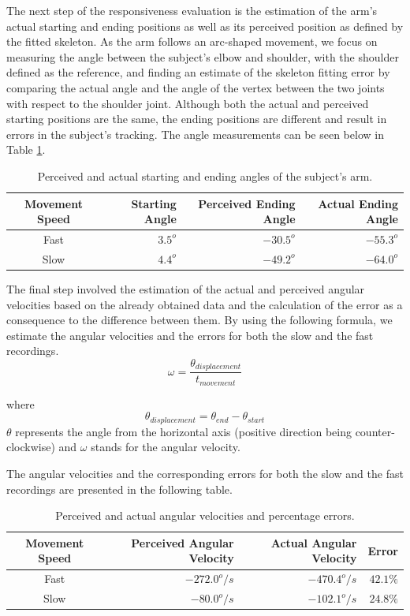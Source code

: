 \documentclass[11pt,a4paper]{article}
\begin{document}
\noindent
The next step of the responsiveness evaluation is the estimation of the arm's actual starting and ending positions as well as its perceived position as defined by the fitted skeleton. As the arm follows an arc-shaped movement, we focus on measuring the angle between the subject's elbow and shoulder, with the shoulder  defined as the reference, and finding an estimate of the skeleton fitting error by comparing the actual angle and the angle of the vertex between the two joints with respect to the shoulder joint. Although both the actual and perceived starting positions are the same, the ending positions are different and result in errors in the subject's tracking. The angle measurements can be seen below in Table \ref{angle_error}.

\begin{table}[H]
\center
\begin{tabular}{| c | r | r | r |}
\hline
Movement Speed & Starting Angle & Perceived Ending Angle & Actual Ending Angle\\
\hline
Fast & $3.5^o$ & $-30.5^o$ & $-55.3^o$\\
Slow & $4.4^o$ & $-49.2^o$ & $-64.0^o$\\
\hline
\end{tabular}
\caption{Perceived and actual starting and ending angles of the subject's arm.}
\label{angle_error}
\end{table}

\noindent
The final step involved the estimation of the actual and perceived angular velocities based on the already obtained data and the calculation of the error as a consequence to the difference between them. By using the following formula, we estimate the angular velocities and the errors for both the slow and the fast recordings.
\begin{equation}
\omega = \frac{\theta_{displacement}}{t_{movement}} 
\end{equation}

\noindent where \[\theta_{displacement} = \theta_{end} - \theta_{start}\]
$\theta$ represents the angle from the horizontal axis (positive direction being counter-clockwise) and $\omega$ stands for the angular velocity.
 
\noindent 
The angular velocities and the corresponding errors for both the slow and the fast recordings are presented in the following table.

\begin{table}[H]
\center
\begin{tabular}{| c | r | r | r |}
\hline
Movement Speed & Perceived Angular Velocity & Actual Angular Velocity & Error\\
\hline
Fast & $-272.0^o/s$ & $-470.4^o/s$ & $42.1\%$ \\
Slow & $-80.0^o/s$  & $-102.1^o/s$ & $24.8\%$ \\
\hline
\end{tabular}
\caption{Perceived and actual angular velocities and percentage errors.}
\end{table}
\end{document}

